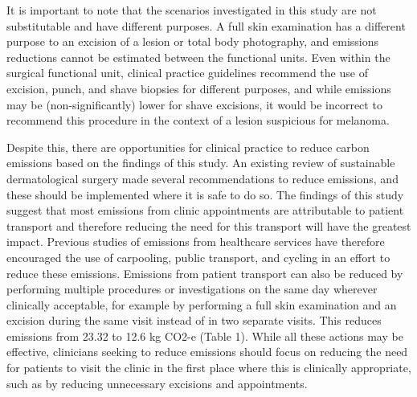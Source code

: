 \begin{refsection}
It is important to note that the scenarios investigated in this study are not substitutable and have different purposes. A full skin examination has a different purpose to an excision of a lesion or total body photography, and emissions reductions cannot be estimated between the functional units. Even within the surgical functional unit, clinical practice guidelines recommend the use of excision, punch, and shave biopsies for different purposes, and while emissions may be (non-significantly) lower for shave excisions, it would be incorrect to recommend this procedure in the context of a lesion suspicious for melanoma.\cite{adler_methods_2019}

Despite this, there are opportunities for clinical practice to reduce carbon emissions based on the findings of this study. An existing review of sustainable dermatological surgery made several recommendations to reduce emissions, and these should be implemented where it is safe to do so.\cite{ali_environmental_2025, ali_environmental_2025-1} The findings of this study suggest that most emissions from clinic appointments are attributable to patient transport and therefore reducing the need for this transport will have the greatest impact. Previous studies of emissions from healthcare services have therefore encouraged the use of carpooling, public transport, and cycling in an effort to reduce these emissions.\cite{tan_carbon_2021, barraclough_carbon_2025} Emissions from patient transport can also be reduced by performing multiple procedures or investigations on the same day wherever clinically acceptable, for example by performing a full skin examination and an excision during the same visit instead of in two separate visits. This reduces emissions from 23.32 to 12.6 kg CO2-e (Table 1). While all these actions may be effective, clinicians seeking to reduce emissions should focus on reducing the need for patients to visit the clinic in the first place where this is clinically appropriate, such as by reducing unnecessary excisions and appointments.


\end{refsection}
